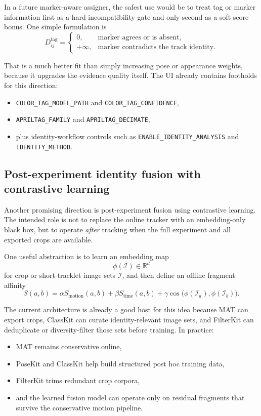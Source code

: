\documentclass[11pt]{article}
\newcommand{\runtimekey}[1]{\texttt{#1}}
\begin{document}
In a future marker-aware assigner, the safest use would be to treat tag or marker information first as a hard incompatibility gate and only second as a soft score bonus. One simple formulation is
\begin{equation}
  D^{\text{tag}}_{ij} =
  \begin{cases}
    0, & \text{marker agrees or is absent},\\
    +\infty, & \text{marker contradicts the track identity}.
  \end{cases}
\end{equation}

That is a much better fit than simply increasing pose or appearance weights, because it upgrades the evidence quality itself. The UI already contains footholds for this direction:
\begin{itemize}
  \item \runtimekey{COLOR\_TAG\_MODEL\_PATH} and \runtimekey{COLOR\_TAG\_CONFIDENCE},
  \item \runtimekey{APRILTAG\_FAMILY} and \runtimekey{APRILTAG\_DECIMATE},
  \item plus identity-workflow controls such as \runtimekey{ENABLE\_IDENTITY\_ANALYSIS} and \runtimekey{IDENTITY\_METHOD}.
\end{itemize}

\subsection{Post-experiment identity fusion with contrastive learning}

Another promising direction is post-experiment fusion using contrastive learning. The intended role is not to replace the online tracker with an embedding-only black box, but to operate \emph{after} tracking when the full experiment and all exported crops are available.

One useful abstraction is to learn an embedding map
\begin{equation}
  \phi(\mathcal{I}) \in \mathbb{R}^d
\end{equation}
for crop or short-tracklet image sets $\mathcal{I}$, and then define an offline fragment affinity
\begin{equation}
  S(a,b) =
  \alpha S_{\text{motion}}(a,b)
  + \beta S_{\text{time}}(a,b)
  + \gamma \cos\!\bigl(\phi(\mathcal{I}_a), \phi(\mathcal{I}_b)\bigr).
\end{equation}

The current architecture is already a good host for this idea because MAT can export crops, ClassKit can curate identity-relevant image sets, and FilterKit can deduplicate or diversity-filter those sets before training. In practice:
\begin{itemize}
  \item MAT remains conservative online,
  \item PoseKit and ClassKit help build structured post hoc training data,
  \item FilterKit trims redundant crop corpora,
  \item and the learned fusion model can operate only on residual fragments that survive the conservative motion pipeline.
\end{itemize}
\end{document}
